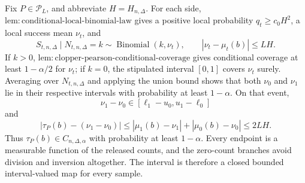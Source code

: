 Fix \(P\in\mathcal P_L\), and abbreviate \(H=H_{n,\Delta}\).  For each side, \(\mathrm{lem:conditional\text{-}local\text{-}binomial\text{-}law}\) gives a positive local probability \(q_t\geq c_0H^2\), a local success mean \(\nu_t\), and
\[
 S_{t,n,\Delta}\mid N_{t,n,\Delta}=k\sim\operatorname{Binomial}(k,\nu_t),
 \qquad |\nu_t-\mu_t(b)|\leq LH.
\]
If \(k>0\), \(\mathrm{lem:clopper\text{-}pearson\text{-}conditional\text{-}coverage}\) gives conditional coverage at least \(1-\alpha/2\) for \(\nu_t\); if \(k=0\), the stipulated interval \([0,1]\) covers \(\nu_t\) surely.  Averaging over \(N_{t,n,\Delta}\) and applying the union bound shows that both \(\nu_0\) and \(\nu_1\) lie in their respective intervals with probability at least \(1-\alpha\).  On that event,
\[
 \nu_1-\nu_0\in[\ell_1-u_0,u_1-\ell_0]
\]
and
\[
 |\tau_P(b)-(\nu_1-\nu_0)|
 \leq|\mu_1(b)-\nu_1|+|\mu_0(b)-\nu_0|
 \leq2LH.
\]
Thus \(\tau_P(b)\in C_{n,\Delta,\alpha}\) with probability at least \(1-\alpha\).  Every endpoint is a measurable function of the released counts, and the zero-count branches avoid division and inversion altogether.  The interval is therefore a closed bounded interval-valued map for every sample.

